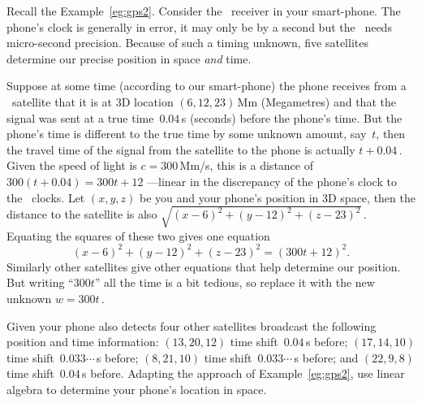 \begin{example} \label{eg:gps3t}
Recall the Example~\ref{eg:gps2}.
Consider the \gps\ receiver in your smart-phone.
The phone's clock is generally in error, it may only be by a second but the \gps\ needs micro-second precision. 
Because of such a timing unknown, five satellites determine our precise position in space \emph{and} time.

Suppose at some time (according to our smart-phone) the phone receives from a \gps\ satellite that it is at 3D location \((6,12,23)\)\,Mm (Megametres) and that the signal was sent at a true time~\(0.04\)\,s (seconds) before the phone's time.
But the phone's time is different to the true time by some unknown amount, say~\(t\), then the travel time of the signal from the satellite to the phone is actually \(t+0.04\)\,.
Given the speed of light is \(c=300\)\,Mm/s, this is a distance of \(300(t+0.04)=300t+12\) ---linear in the discrepancy of the phone's clock to the \gps\ clocks.
Let \((x,y,z)\) be you and your phone's position in 3D space, then the distance to the satellite is also \(\sqrt{(x-6)^2+(y-12)^2+(z-23)^2}\)\,.
Equating the squares of these two gives one equation
\begin{equation*}
(x-6)^2+(y-12)^2+(z-23)^2=(300t+12)^2.
\end{equation*}
Similarly other satellites give other equations that help determine our position.
But writing ``\(300t\)'' all the time is a bit tedious, so replace it with the new unknown \(w=300t\)\,.

Given your phone also detects four other satellites broadcast the following position and time information:
\((13,20,12)\) time shift~\(0.04\)\,s before;
\((17,14,10)\) time shift~\(0.033\cdots\)\,s before;
\((8,21,10)\) time shift~\(0.033\cdots\)\,s before; and
\((22,9,8)\) time shift~\(0.04\)\,s before.
Adapting the approach of Example~\ref{eg:gps2}, use linear algebra to determine your phone's location in space.


\end{example}
